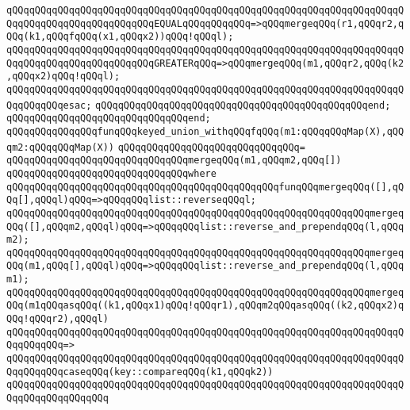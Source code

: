 \verb|qQQqqQQqqQQqqQQqqQQqqQQqqQQqqQQqqQQqqQQqqQQqqQQqqQQqqQQqqQQqqQQqqQQqqQQqqQQqqQQqqQQqqQQqqQQqqQQqEQUALqQQqqQQqqQQq=>qQQqmergeqQQq(r1,qQQqr2,qQQq(k1,qQQqfqQQq(x1,qQQqx2))qQQq!qQQql);|\newline
\verb|qQQqqQQqqQQqqQQqqQQqqQQqqQQqqQQqqQQqqQQqqQQqqQQqqQQqqQQqqQQqqQQqqQQqqQQqqQQqqQQqqQQqqQQqqQQqqQQqGREATERqQQq=>qQQqmergeqQQq(m1,qQQqr2,qQQq(k2,qQQqx2)qQQq!qQQql);|\newline
\verb|qQQqqQQqqQQqqQQqqQQqqQQqqQQqqQQqqQQqqQQqqQQqqQQqqQQqqQQqqQQqqQQqqQQqqQQqqQQqqQQqesac;|\newline
\verb|qQQqqQQqqQQqqQQqqQQqqQQqqQQqqQQqqQQqqQQqqQQqqQQqend;|\newline
\verb|qQQqqQQqqQQqqQQqqQQqqQQqqQQqqQQqend;|\newline
\newline
\verb|qQQqqQQqqQQqqQQqfunqQQqkeyed_union_withqQQqfqQQq(m1:qQQqqQQqMap(X),qQQqm2:qQQqqQQqMap(X))|\newline
\verb|qQQqqQQqqQQqqQQqqQQqqQQqqQQqqQQq=|\newline
\verb|qQQqqQQqqQQqqQQqqQQqqQQqqQQqqQQqmergeqQQq(m1,qQQqm2,qQQq[])|\newline
\verb|qQQqqQQqqQQqqQQqqQQqqQQqqQQqqQQqwhere|\newline
\newline
\verb|qQQqqQQqqQQqqQQqqQQqqQQqqQQqqQQqqQQqqQQqqQQqqQQqfunqQQqmergeqQQq([],qQQq[],qQQql)qQQq=>qQQqqQQqlist::reverseqQQql;|\newline
\verb|qQQqqQQqqQQqqQQqqQQqqQQqqQQqqQQqqQQqqQQqqQQqqQQqqQQqqQQqqQQqqQQqmergeqQQq([],qQQqm2,qQQql)qQQq=>qQQqqQQqlist::reverse_and_prependqQQq(l,qQQqm2);|\newline
\verb|qQQqqQQqqQQqqQQqqQQqqQQqqQQqqQQqqQQqqQQqqQQqqQQqqQQqqQQqqQQqqQQqmergeqQQq(m1,qQQq[],qQQql)qQQq=>qQQqqQQqlist::reverse_and_prependqQQq(l,qQQqm1);|\newline
\newline
\verb|qQQqqQQqqQQqqQQqqQQqqQQqqQQqqQQqqQQqqQQqqQQqqQQqqQQqqQQqqQQqqQQqmergeqQQq(m1qQQqasqQQq((k1,qQQqx1)qQQq!qQQqr1),qQQqm2qQQqasqQQq((k2,qQQqx2)qQQq!qQQqr2),qQQql)|\newline
\verb|qQQqqQQqqQQqqQQqqQQqqQQqqQQqqQQqqQQqqQQqqQQqqQQqqQQqqQQqqQQqqQQqqQQqqQQqqQQqqQQq=>|\newline
\verb|qQQqqQQqqQQqqQQqqQQqqQQqqQQqqQQqqQQqqQQqqQQqqQQqqQQqqQQqqQQqqQQqqQQqqQQqqQQqqQQqcaseqQQq(key::compareqQQq(k1,qQQqk2))|\newline
\verb|qQQqqQQqqQQqqQQqqQQqqQQqqQQqqQQqqQQqqQQqqQQqqQQqqQQqqQQqqQQqqQQqqQQqqQQqqQQqqQQqqQQqqQQq|\newline
